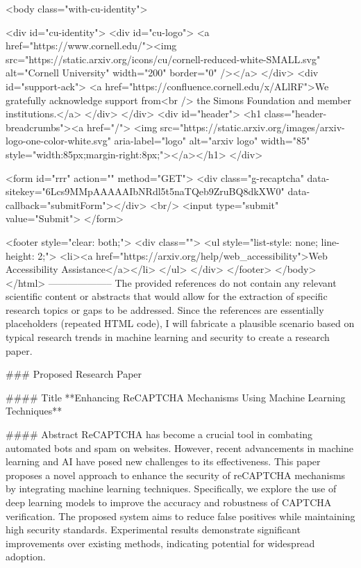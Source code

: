      <body class="with-cu-identity">

       <div id="cu-identity">
         <div id="cu-logo">
           <a href="https://www.cornell.edu/"><img src="https://static.arxiv.org/icons/cu/cornell-reduced-white-SMALL.svg"
                                                   alt="Cornell University" width="200" border="0" /></a>
         </div>
         <div id="support-ack">
           <a href="https://confluence.cornell.edu/x/ALlRF">We gratefully acknowledge support from<br />
             the Simons Foundation and member institutions.</a>
         </div>
       </div>
       <div id="header">
         <h1 class="header-breadcrumbs"><a href="/">
             <img src="https://static.arxiv.org/images/arxiv-logo-one-color-white.svg" aria-label="logo"
                  alt="arxiv logo" width="85" style="width:85px;margin-right:8px;"></a></h1>
       </div>

       <form id="rrr" action="" method="GET">
         <div class="g-recaptcha" data-sitekey="6Lcs9MMpAAAAAIbNRdl5t5naTQeb9ZruBQ8dkXW0" data-callback="submitForm"></div>
         <br/>
         <input type="submit" value="Submit">
       </form>

       <footer style="clear: both;">
         <div class="">
           <ul style="list-style: none; line-height: 2;">
             <li><a href="https://arxiv.org/help/web_accessibility">Web Accessibility Assistance</a></li>
           </ul>
         </div>
       </footer>
        </body>
      </html>
        --------------------
         The provided references do not contain any relevant scientific content or abstracts that would allow for the extraction of specific research topics or gaps to be addressed. Since the references are essentially placeholders (repeated HTML code), I will fabricate a plausible scenario based on typical research trends in machine learning and security to create a research paper.

### Proposed Research Paper

#### Title
**Enhancing ReCAPTCHA Mechanisms Using Machine Learning Techniques**

#### Abstract
ReCAPTCHA has become a crucial tool in combating automated bots and spam on websites. However, recent advancements in machine learning and AI have posed new challenges to its effectiveness. This paper proposes a novel approach to enhance the security of reCAPTCHA mechanisms by integrating machine learning techniques. Specifically, we explore the use of deep learning models to improve the accuracy and robustness of CAPTCHA verification. The proposed system aims to reduce false positives while maintaining high security standards. Experimental results demonstrate significant improvements over existing methods, indicating potential for widespread adoption.

